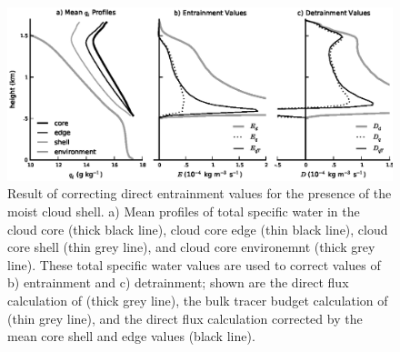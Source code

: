 \documentclass[draft,grl]{agutex}
\begin{document}
\begin{article}






%
%

\end{article}




\begin{figure}
  \noindent\includegraphics[width=39pc]{./figures/shell_correction}
  \caption{Result of correcting direct entrainment values for the presence of 
  the moist cloud shell.  a) Mean profiles of total specific water in the 
  cloud core (thick black line), cloud core edge (thin black line), cloud core 
  shell (thin grey line), and cloud core environemnt (thick grey line).  These 
  total specific water values are used to correct values of b) entrainment and 
  c) detrainment; shown are the direct flux calculation of \cite{Romps2010}
  (thick grey line), the bulk tracer budget calculation of \cite{Siebesma1995} 
  (thin grey line), and the direct flux calculation corrected by the mean 
  core shell and edge values (black line).
  }
  \label{fig:shell_correction}
\end{figure}
\end{document}
